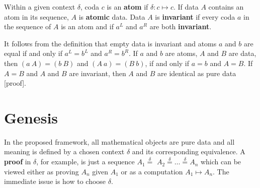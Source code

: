 \documentclass[11pt]{article}
\begin{document}
\begin{definition}
{Within a given context $\delta$, coda $c$ is an {\bf atom} if $\delta:c\mapsto c$.  If data $A$ contains an atom in its sequence, $A$ is {\bf atomic} data. 
Data $A$ is {\bf invariant} if every coda $a$ in the sequence of $A$ is an atom and if $a^L$ and $a^R$ are both {\bf invariant}. }
\end{definition}
\noindent It follows from the definition that empty data is invariant and atoms $a$ and $b$ are equal if and only if $a^L=b^L$ and $a^R=b^R$.  If $a$ and $b$ are atoms, 
$A$ and $B$ are data, then $(a\ A)=(b\ B)$ and $(A\ a)=(B\ b)$, if and only if $a=b$ and $A=B$.  If $A=B$ and $A$ and $B$ are invariant, then $A$ and 
$B$ are identical as pure data [proof].

\section{Genesis}

    In the proposed framework, all mathematical objects are pure data and all meaning is defined by a chosen context $\delta$ and its corresponding equivalence.  
A {\bf proof} in $\delta$, for example, is just a sequence $A_1{\overset \delta =}$ $A_2 {\overset \delta =} \dots {\overset \delta =}$$A_n$ which can be viewed either as proving $A_n$ 
given $A_1$ or as a computation $A_1\mapsto A_n$. 
The immediate issue is how to choose $\delta$.  
    
\end{document}
